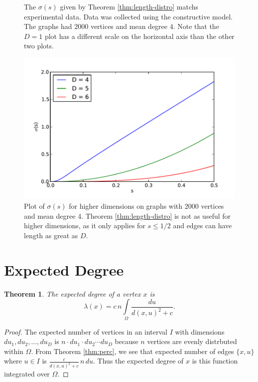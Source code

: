 \documentclass[a4paper,10pt]{article}
\newtheorem{theorem}{Theorem}
\begin{document}
\begin{figure}
\begin{subfigure}[b]{.4\textwidth}
 	\end{subfigure}
 \caption{The $\sigma(s)$ given by Theorem \ref{thm:length-distro} matchs experimental data. Data was collected using the constructive model. The graphs had 2000 vertices and mean degree 4. Note that the $D = 1$ plot has a different scale on the horizontal axis than the other two plots.}
\end{figure}

\begin{figure}
 \centering
 \includegraphics[scale=.7]{images/sigma_multi.pdf}
 \caption{Plot of $\sigma(s)$ for higher dimensions on graphs with 2000 vertices and mean degree 4. Theorem \ref{thm:length-distro} is not as useful for higher dimensions, as it only applies for $s \leq 1/2$ and edges can have length as great as $D$. }
\end{figure}

\section{Expected Degree}
\begin{theorem}
\label{thm:lambdax}
The expected degree of a vertex $x$ is
 \begin{equation}
 \lambda(x) = c\,n\int\limits_\Omega \frac{du}{d(x, u)^2 + c}.
\end{equation}
\end{theorem}
\begin{proof}
The expected number of vertices in an interval $I$ with dimensions $du_1, du_2, \ldots, du_D$  is $n \cdot du_1 \cdot du_2 \cdots du_D$ because $n$ vertices are evenly distrbuted within $\Omega$. From Theorem \ref{thm:perc}, we see that expected number of edges $\{x, u\}$ where $u \in I$ is $\frac{c}{d(x, u)^2 + c} \, n \, du$. Thus the expected degree of $x$ is this function integrated over $\Omega$.
\end{proof}
\end{document}
